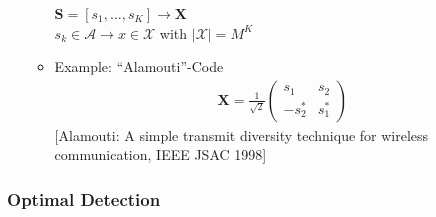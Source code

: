 \documentclass[a4paper, 10pt]{article}
\begin{document}
\begin{itemize}
\begin{itemize}
			$\mathbf{S}=[s_1,\dots ,s_K] \rightarrow \mathbf{X}$\\
			$s_k\in \mathcal{A} \rightarrow x\in\mathcal{X}$ with $|\mathcal{X}|=M^K$
			\item Example: ``Alamouti''-Code\\
			\begin{align*}
				\mathbf{X}=\frac{1}{\sqrt{2}}
				\begin{pmatrix}
					s_1 & s_2 \\
					-s_2^* & s_1^*
				\end{pmatrix}
			\end{align*}
			{\small[Alamouti: A simple transmit diversity technique for wireless communication, IEEE JSAC 1998]}
		\end{itemize}
\end{itemize}
\subsubsection*{Optimal Detection}
\end{document}
